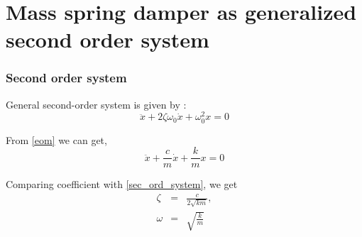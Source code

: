 \documentclass[10pt]{beamer}
\begin{document}
\section{Mass spring damper as generalized second order system}

\begin{frame}
\frametitle{Second order system}
General second-order system is given by :
\begin{equation}
\ddot{x} + 2\zeta\omega_0\dot{x} + \omega_0^2x = 0
\label{sec_ord_system}
\end{equation}

From \ref{eom} we can get,
\begin{equation}
\ddot{x} + \frac{c}{m}\dot{x} + \frac{k}{m}x = 0
\label{mass_spring_system}
\end{equation}

Comparing coefficient with \ref{sec_ord_system}, we get
\begin{eqnarray}
\zeta &=& \frac{c}{2\sqrt{km}}, \\
\label{def_zeta}
\omega &=& \sqrt{\frac{k}{m}}
\label{def_omega}
\end{eqnarray}

\end{frame}
 
\end{document}
